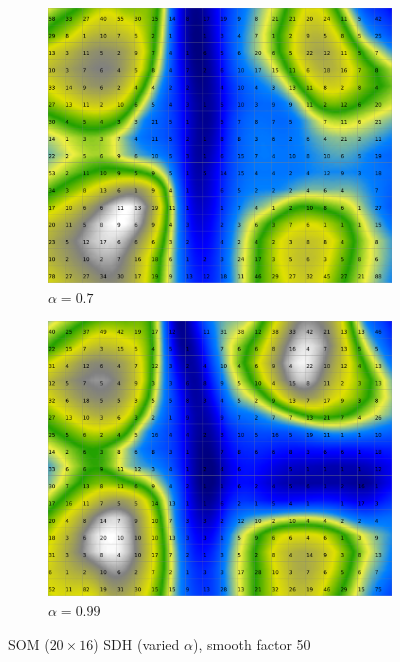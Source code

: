 \documentclass{acm_proc_article-sp}
\begin{document}
\begin{figure}
\begin{subfigure}[b]{0.24\linewidth}
        \label{fig:wine-20x16-smoothed-data-histogram-alpha-0,45-f-50}
    \end{subfigure}
    \begin{subfigure}[b]{0.24\linewidth}
        \includegraphics[width=\linewidth]{img/wine-20x16-smoothed-data-histogram-alpha-0,7-f-50}
        \caption{$\alpha=0.7$}
        \label{fig:wine-20x16-smoothed-data-histogram-alpha-0,7-f-50}
    \end{subfigure}
    \begin{subfigure}[b]{0.24\linewidth}
        \includegraphics[width=\linewidth]{img/wine-20x16-smoothed-data-histogram-alpha-0,99-f-50}
        \caption{$\alpha=0.99$}
        \label{fig:wine-20x16-smoothed-data-histogram-alpha-0,99-f-50}
    \end{subfigure}
    \caption{SOM ($20\times16$) SDH (varied $\alpha$), smooth factor 50}
    \label{fig:wine-20x16-smoothed-data-histogram-alpha-f-50}
\end{figure}
\end{document}
